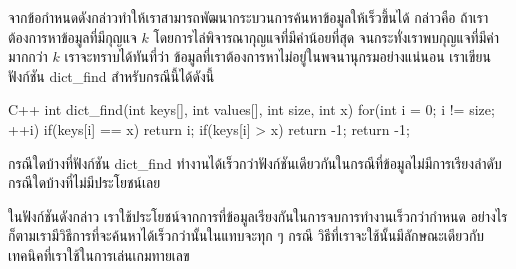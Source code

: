 จาก{\wbr}ข้อกำหนด{\wbr}ดังกล่าว{\wbr}ทำ{\wbr}ให้{\wbr}เรา{\wbr}สามารถ{\wbr}พัฒนา{\wbr}กระบวนการ{\wbr}ค้นหา{\wbr}ข้อมูล{\wbr}ให้{\wbr}เร็ว{\wbr}ขึ้น{\wbr}ได้ กล่าวคือ{\wbr}
ถ้า{\wbr}เรา{\wbr}ต้องการ{\wbr}หา{\wbr}ข้อมูล{\wbr}ที่{\wbr}มี{\wbr}กุญแจ $k$ โดย{\wbr}การ{\wbr}ไล่{\wbr}พิจารณา{\wbr}กุญแจ{\wbr}ที่{\wbr}มี{\wbr}ค่า{\wbr}น้อย{\wbr}ที่สุด{\wbr}
จนกระทั่ง{\wbr}เรา{\wbr}พบ{\wbr}กุญแจ{\wbr}ที่{\wbr}มี{\wbr}ค่า{\wbr}มาก{\wbr}กว่า $k$ เรา{\wbr}จะ{\wbr}ทราบ{\wbr}ได้{\wbr}ทัน{\wbr}ที่{\wbr}ว่า{\wbr}
ข้อมูล{\wbr}ที่{\wbr}เรา{\wbr}ต้องการ{\wbr}หาไม่{\wbr}อยู่{\wbr}ใน{\wbr}พจนานุกรม{\wbr}อย่าง{\wbr}แน่นอน เรา{\wbr}เขียน{\wbr}ฟังก์ชัน {\ct dict\_find}
สำหรับ{\wbr}กรณี{\wbr}นี้{\wbr}ได้{\wbr}ดังนี้{\wbr}

\latintext
\begin{codelist}{C++}{}
int dict_find(int keys[], int values[], int size, int x)
{
  for(int i = 0; i != size; ++i) {
    if(keys[i] == x)
      return i;
    if(keys[i] > x)
      return -1;
  }
  return -1; 
}
\end{codelist}
\thaitext

\begin{quiz}{}
กรณี{\wbr}ใด{\wbr}บ้าง{\wbr}ที่{\wbr}ฟังก์ชัน {\ct dict\_find}
ทำงาน{\wbr}ได้{\wbr}เร็ว{\wbr}กว่า{\wbr}ฟังก์ชัน{\wbr}เดียวกัน{\wbr}ใน{\wbr}กรณี{\wbr}ที่{\wbr}ข้อมูล{\wbr}ไม่{\wbr}มี{\wbr}การ{\wbr}เรียงลำดับ{\wbr}
กรณี{\wbr}ใด{\wbr}บ้าง{\wbr}ที่{\wbr}ไม่{\wbr}มี{\wbr}ประโยชน์{\wbr}เลย{\wbr}
\end{quiz}

ใน{\wbr}ฟังก์ชัน{\wbr}ดังกล่าว เรา{\wbr}ใช้ประโยชน์{\wbr}จาก{\wbr}การ{\wbr}ที่{\wbr}ข้อมูล{\wbr}เรียง{\wbr}กัน{\wbr}ใน{\wbr}การ{\wbr}จบ{\wbr}การ{\wbr}ทำงาน{\wbr}เร็ว{\wbr}กว่า{\wbr}กำหนด{\wbr}
อย่างไรก็ตาม{\wbr}เรา{\wbr}มี{\wbr}วิธีการ{\wbr}ที่{\wbr}จะ{\wbr}ค้นหา{\wbr}ได้{\wbr}เร็ว{\wbr}กว่า{\wbr}นั้น{\wbr}ใน{\wbr}แทบ{\wbr}จะ{\wbr}ทุก ๆ กรณี{\wbr}
วิธี{\wbr}ที่{\wbr}เรา{\wbr}จะ{\wbr}ใช้{\wbr}นั้น{\wbr}มี{\wbr}ลักษณะ{\wbr}เดียวกับ{\wbr}เทคนิค{\wbr}ที่{\wbr}เรา{\wbr}ใช้{\wbr}ใน{\wbr}การ{\wbr}เล่น{\wbr}เกม{\wbr}ทาย{\wbr}เลข{\wbr}

